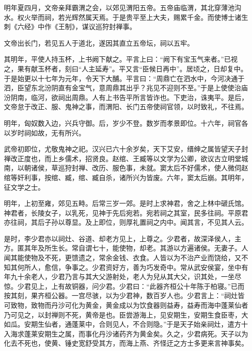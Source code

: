 \documentclass[12pt,UTF8]{ctexbook}
\begin{document}
明年夏四月，文帝亲拜霸渭之会，以郊见渭阳五帝。五帝庙临渭，其北穿薄池沟水。权火举而祠，若光辉然属天焉。于是贵平至上大夫，赐累千金。而使博士诸生刺《六经》中作《王制》，谋议巡狩封禅事。



文帝出长门，若见五人于道北，遂因其直立五帝坛，祠以五牢。



其明年，平使人持玉杯，上书阙下献之。平言上曰：“阙下有宝玉气来者。”已视之，果有献玉杯者，刻曰“人主延寿”。平又言“臣候日再中”。居顷之，日却复中。于是始更以十七年为元年，令天下大酺。平言曰：“周鼎亡在泗水中，今河决通于泗，臣望东北汾阴直有金宝气，意周鼎其出乎？兆见不迎则不至。”于是上使使治庙汾阴南，临河，欲祠出周鼎。人有上书告平所言皆诈也。下吏治，诛夷平。是后，文帝怠于改正、服、鬼神之事，而渭阳、长门五帝使祠官领，以时致礼，不往焉。



明年，匈奴数入边，兴兵守御。后，岁少不登。数岁而孝景即位。十六年，祠官各以岁时祠如故，无有所兴。



武帝初即位，尤敬鬼神之祀。汉兴已六十余岁矣，天下艾安，缙绅之属皆望天子封禅改正度也，而上乡儒术，招贤良。赵绾、王臧等以文学为公卿，欲议古立明堂城南，以朝诸侯，草巡狩封禅、改历、服色事，未就。窦太后不好儒术，使人微伺赵绾等奸利事，按绾、臧，绾、臧自杀，诸所兴为皆废。六年，窦太后崩。其明年，征文学之士。



明年，上初至雍，郊见五畤。后常三岁一郊。是时上求神君，舍之上林中磃氏馆。神君者，长陵女子，以乳死，见神于先后宛若。宛若祠之其室，民多往祠。平原君亦往祠，其后子孙以尊显。及上即位，则厚礼置祠之内中。闻其言，不见其人云。



是时，李少君亦以祠灶、谷道、却老方见上，上尊之。少君者，故深泽侯人，主方。匿其年及所生长。常自谓七十，能使物，却老。其游以方遍诸侯。无妻子。人闻其能使物及不死，更馈遗之，常余金钱、衣食。人皆以为不治产业而饶给，又不知其何所人，愈信，争事之。少君资好方，善为巧发奇中。常从武安侯宴，坐中有年九十余老人，少君乃言与其大父游射处，老人为兒从其大父，识其处，一坐尽惊。少君见上，上有故铜器，问少君。少君曰：“此器齐桓公十年陈于柏寝。”已而按其刻，果齐桓公器。一宫尽骇，以为少君神，数百岁人也。少君言上：“祠灶皆可致物，致物而丹沙可化为黄金，黄金成以为饮食器则益寿，益寿而海中蓬莱仙者乃可见之，以封禅则不死，黄帝是也。臣尝游海上，见安期生，安期生食臣枣，大如瓜。安期生仙者，通蓬莱中，合则见人，不合则隐。”于是天子始亲祠灶，遣方十入海求蓬莱安期生之属，而事化丹沙诸药齐为黄金矣。久之，少君病死。天子以为化去不死也，使黄、锤史宽舒受其方，而海上燕、齐怪迂之方士多更来言神事矣。
\end{document}
